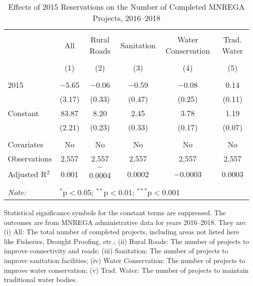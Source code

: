 \begin{table}[!htbp]
\centering
\begin{threeparttable}

  \caption{Effects of 2015 Reservations on the Number of Completed MNREGA Projects, 2016--2018} 
  \label{main_mnrega_15} 
\scriptsize 
\begin{tabular}{@{\extracolsep{0pt}}lccccc} 
\\[-1.8ex]\hline 
\hline \\[-1.8ex] 
 & All & Rural Roads & Sanitation & Water Conservation & Trad. Water \\ 
\\[-1.8ex] & (1) & (2) & (3) & (4) & (5)\\ 
\hline \\[-1.8ex] 
 2015 & $-$5.65 & $-$0.06 & $-$0.59 & $-$0.08 & 0.14 \\ 
  & (3.17) & (0.33) & (0.47) & (0.25) & (0.11) \\ 
  Constant & 83.87 & 8.20 & 2.45 & 3.78 & 1.19 \\ 
  & (2.21) & (0.23) & (0.33) & (0.17) & (0.07) \\ 
 \hline \\[-1.8ex] 
Covariates & No & No & No & No & No \\ 
Observations & 2,557 & 2,557 & 2,557 & 2,557 & 2,557 \\ 
Adjusted R$^{2}$ & 0.001 & $-$0.0004 & 0.0002 & $-$0.0003 & 0.0003 \\ 
\hline 
\hline \\[-1.8ex] 
\textit{Note:}  & \multicolumn{5}{l}{$^{*}$p$<$0.05; $^{**}$p$<$0.01; $^{***}$p$<$0.001} \\ 
\end{tabular} 
\begin{tablenotes}[flushleft]
\scriptsize
\item[] Statistical significance symbols for the constant terms are suppressed. The outcomes are from MNREGA administrative data for years 2016--2018. They are: 
(i) All: The total number of completed projects, including areas not listed here like Fisheries, Drought Proofing, etc.;
(ii) Rural Roads: The number of projects to improve connectivity and roads;
(iii) Sanitation: The number of projects to improve sanitation facilities;
(iv) Water Conservation: The number of projects to improve water conservation;
(v) Trad. Water: The number of projects to maintain traditional water bodies.
\end{tablenotes}
\end{threeparttable}
\end{table}
